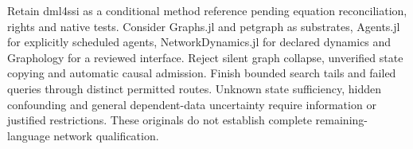 Retain dml4ssi as a conditional method reference pending equation reconciliation,
rights and native tests. Consider Graphs.jl and petgraph as substrates,
Agents.jl for explicitly scheduled agents, NetworkDynamics.jl for declared
dynamics and Graphology for a reviewed interface. Reject silent graph collapse,
unverified state copying and automatic causal admission. Finish bounded search
tails and failed queries through distinct permitted routes. Unknown state
sufficiency, hidden confounding and general dependent-data uncertainty require
information or justified restrictions. These originals do not establish
complete remaining-language network qualification.\citep{exec25_onet_choice}
